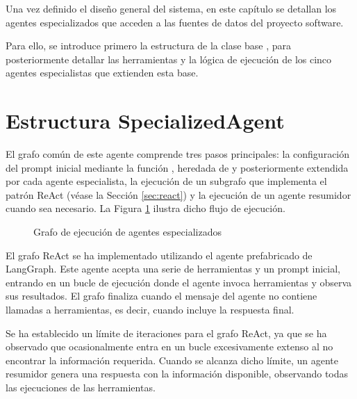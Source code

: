 Una vez definido el diseño general del sistema, en este capítulo se detallan los agentes especializados que acceden a las fuentes de datos del proyecto software.

Para ello, se introduce primero la estructura de la clase base , para posteriormente detallar las herramientas y la lógica de ejecución de los cinco agentes especialistas que extienden esta base.

\section{Estructura SpecializedAgent}
El grafo común de este agente comprende tres pasos principales: la configuración del prompt inicial mediante la función , heredada de  y posteriormente extendida por cada agente especialista, la ejecución de un subgrafo que implementa el patrón ReAct (véase la Sección \ref{sec:react}) y la ejecución de un agente resumidor cuando sea necesario. La Figura \ref{fig:specialized} ilustra dicho flujo de ejecución.

\begin{figure}[h]
  \centering
  \caption{Grafo de ejecución de agentes especializados}
  \label{fig:specialized}
\end{figure}

El grafo ReAct se ha implementado utilizando el agente prefabricado  de LangGraph. Este agente acepta una serie de herramientas y un prompt inicial, entrando en un bucle de ejecución donde el agente invoca herramientas y observa sus resultados. El grafo finaliza cuando el mensaje del agente no contiene llamadas a herramientas, es decir, cuando incluye la respuesta final.

Se ha establecido un límite de iteraciones para el grafo ReAct, ya que se ha observado que ocasionalmente entra en un bucle excesivamente extenso al no encontrar la información requerida. Cuando se alcanza dicho límite, un agente resumidor genera una respuesta con la información disponible, observando todas las ejecuciones de las herramientas. 

